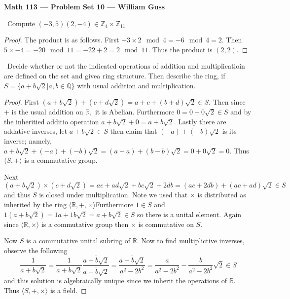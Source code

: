 \documentclass[11pt]{amsart}
\begin{document}
\begin{center}{\bf Math 113 --- Problem Set 10 --- William Guss} \end{center}


\bigskip


\medskip {}\ Compute $(-3,5)(2	,-4) \in \mathbb{Z}_4 \times \mathbb{Z}_{11}$
\begin{proof}
	The product is as follows. First $-3 \times 2 \mod 4 = -6 \mod 4 = 2.$ Then $5 \times -4 = -20 \mod 11 = -22 + 2 = 2 \mod 11.$ Thus the product is $(2,2).$
\end{proof}
\medskip {}\ Decide whether or not the indicated operations of addition and multiplicatioin are defined on the set and givea  ring structure. Then describe the ring, if $S = \{a +b\sqrt{2}| a, b \in \mathbb{Q}\}$ with usual addition and multiplication.
\begin{proof}
	First $(a + b \sqrt{2}) + (c+ d\sqrt{2}) = a+c + (b+d)\sqrt{2} \in S$. Then since $+$ is the usual addition on $\mathbb{R},$ it is Abelian. Furthermore $0 =0 + 0\sqrt{2} \in S$ and by the inheritied additio operation $a+b \sqrt{2} + 0 = a+ b \sqrt{2}$. Lastly there are addative inverses, let $a+b\sqrt{2} \in S$ then claim that $(-a) + (-b)\sqrt{2}$ is its inverse; namely, $a+b\sqrt{2} + (-a) + (-b)\sqrt{2} = (a- a) + (b -b)\sqrt{2} = 0 + 0\sqrt{2} = 0.$ Thus $\langle S, +\rangle$ is a commutative group.

	Next $(a + b \sqrt{2}) \times (c+ d\sqrt{2}) = ac + ad \sqrt{2} + bc \sqrt{2} + 2db =(ac + 2db) + (ac + ad)\sqrt{2} \in S$
	and thus $S$ is closed under multiplication. Note we used that $\times$ is distributed as inherited by the ring $\langle \mathbb{R}, +, \times \rangle$Furthermore $1 \in S$ and $1(a + b\sqrt{2}) = 1a + 1b\sqrt{2} = a + b \sqrt{2} \in S$ so there is a unital element. Again since $\langle \mathbb{R}, \times \rangle$ is a commutative group then $\times$ is commutative on $S$.

	Now $S$ is a commutative unital subring of $\mathbb{R}.$ Now to find multiplictive inverses, observe the following
	\begin{equation*}
		\frac{1}{a + b\sqrt{2}} = \frac{1}{a + b\sqrt{2}}\frac{\overline{a + b\sqrt{2}}}{\overline{a + b\sqrt{2}}} = \frac{\overline{a + b\sqrt{2}}}{a^2 - 2b^2} = \frac{a}{a^2 - 2b^2} - \frac{b}{a^2 - 2b^2}\sqrt{2} \in S
	\end{equation*}
	and this solution is algebraically unique since we inherit the operations of $\mathbb{R}.$ Thus $\langle S, +, \times \rangle$ is a field.

\end{proof}
\end{document}
